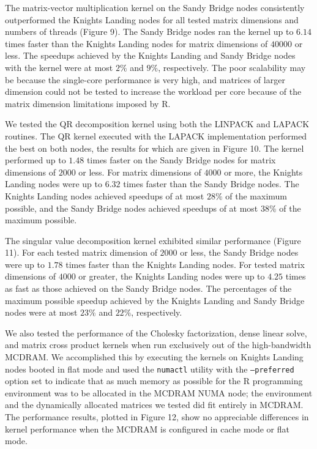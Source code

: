 The matrix-vector multiplication kernel on the Sandy Bridge nodes consistently
  outperformed the Knights Landing nodes for all tested matrix dimensions and
  numbers of threads (Figure 9).
The Sandy Bridge nodes ran the kernel up to $6.14$ times faster than the
  Knights Landing nodes for matrix dimensions of $40000$ or less.
The speedups achieved by the Knights Landing and Sandy Bridge nodes with the
  kernel were at most $2\%$ and $9\%$, respectively.
The poor scalability may be because the single-core performance is very high,
  and matrices of larger dimension could not be tested to increase the workload
  per core because of the matrix dimension limitations imposed by R.

We tested the QR decomposition kernel using both the LINPACK and LAPACK
  routines.
The QR kernel executed with the LAPACK implementation performed the best on both
  nodes, the results for which are given in Figure 10.
The kernel performed up to $1.48$ times faster on the Sandy Bridge nodes for
  matrix dimensions of $2000$ or less.
For matrix dimensions of $4000$ or more, the Knights Landing nodes were up to
  $6.32$ times faster than the Sandy Bridge nodes.
The Knights Landing nodes achieved speedups of at most $28\%$ of the maximum
  possible, and the Sandy Bridge nodes achieved speedups of at most $38\%$ of
  the maximum possible. 

The singular value decomposition kernel exhibited similar performance
  (Figure 11).
For each tested matrix dimension of $2000$ or less, the Sandy Bridge nodes were
  up to $1.78$ times faster than the Knights Landing nodes.
For tested matrix dimensions of $4000$ or greater, the Knights Landing nodes
  were up to $4.25$ times as fast as those achieved on the Sandy Bridge nodes.
The percentages of the maximum possible speedup achieved by the Knights Landing
  and Sandy Bridge nodes were at most $23\%$ and $22\%$, respectively.  

We also tested the performance of the Cholesky factorization, dense linear
  solve, and matrix cross product kernels when run exclusively out of the
  high-bandwidth MCDRAM.
We accomplished this by executing the kernels on Knights Landing nodes booted in
  flat mode and used the \texttt{numactl} utility with the \texttt{--preferred} option
  set to indicate that as much memory as possible for the R programming
  environment was to be allocated in the MCDRAM NUMA node; the environment and
  the dynamically allocated matrices we tested did fit entirely in MCDRAM.
The performance results, plotted in Figure 12, show no appreciable differences
  in kernel performance when the MCDRAM is configured in cache mode or flat
  mode.

